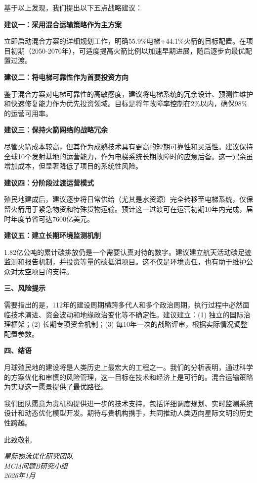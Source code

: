 基于以上发现，我们提出以下五点战略建议：

\textbf{建议一：采用混合运输策略作为主方案}

立即启动混合方案的详细规划工作，明确55.9\%电梯+44.1\%火箭的目标配置。在项目初期（2050-2070年），可适度提高火箭比例以加速早期进展，随后逐步向最优配置过渡。

\textbf{建议二：将电梯可靠性作为首要投资方向}

鉴于混合方案对电梯可靠性的高敏感度，建议将电梯系统的冗余设计、预测性维护和快速修复能力作为优先投资领域。目标是将年故障率控制在2\%以内，确保98\%的运营可用率。

\textbf{建议三：保持火箭网络的战略冗余}

尽管火箭成本较高，但其作为成熟技术具有更高的短期可靠性和灵活性。建议保持全球10个发射基地的运营能力，作为电梯系统长期故障时的应急后备。这一冗余虽增加成本，但显著降低了项目的系统性风险。

\textbf{建议四：分阶段过渡运营模式}

殖民地建成后，建议逐步将日常供给（尤其是水资源）完全转移至电梯系统，仅保留火箭用于紧急物资和特殊货物运输。预计这一过渡可在运营初期10年内完成，届时年度节省可达7600亿美元。

\textbf{建议五：建立长期环境监测机制}

1.82亿公吨的累计碳排放仍是一个需要认真对待的数字。建议建立航天活动碳足迹监测和报告机制，并投资等量的碳抵消项目。这不仅是环境责任，也有助于维护公众对太空项目的支持。

\vspace{0.5em}
\noindent\textbf{三、风险提示}

需要指出的是，112年的建设周期横跨多代人和多个政治周期，执行过程中必然面临技术演进、资金波动和地缘政治变化等不确定性。建议建立：(1) 独立的国际治理框架；(2) 长期专项资金机制；(3) 每10年一次的战略评审，根据实际情况调整配置参数。

\vspace{0.5em}
\noindent\textbf{四、结语}

月球殖民地的建设将是人类历史上最宏大的工程之一。我们的分析表明，通过科学的方案优化和审慎的风险管理，这一目标在技术和经济上是可行的。混合运输策略为实现这一愿景提供了最优路径。

我们团队愿意为贵机构提供进一步的技术支持，包括详细调度规划、实时监测系统设计和动态优化模型开发。期待与贵机构携手，共同推动人类迈向星际文明的历史性跨越。

\vspace{1.5em}

\noindent 此致敬礼

\vspace{0.8em}

\noindent\textit{星际物流优化研究团队}\\
\textit{MCM问题B研究小组}\\
\textit{2026年1月}
